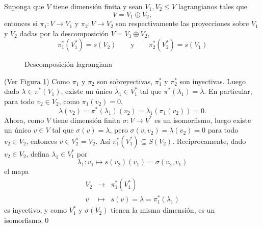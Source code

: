 \begin{pro}
Suponga que $V$ tiene dimensi\'on finita y sean $V_1,V_2\le V$ lagrangianos tales que 
\[
V=V_1\oplus V_2,
\]
entonces si $\pi_1:V\rightarrow V_1$ y $\pi_2:V\rightarrow V_2$ son respectivamente las proyecciones sobre $V_1$ y $V_2$ dadas por la descomposici\'on $V=V_1\oplus V_2$,
\[
\pi_1^*(V_1^*)=s(V_2)\qquad\textrm{y}\qquad\pi_2^*(V_2^*)=s(V_1)
\]
\end{pro}
\begin{figure}[!hbp]
\centering
{}
\caption{Descomposici\'on lagrangiana}
\label{desclag}
\end{figure}

\dem (Ver Figura \ref{desclag}) Como $\pi_1$ y $\pi_2$ son sobreyectivas, $\pi_1^*$ y $\pi_2^*$ son  inyectivas. Luego dado $\lambda\in\pi^*(V_1)$, existe un \'unico $\lambda_1\in V_1^*$ tal que $\pi^*(\lambda_1)=\lambda$. En particular, para todo $v_2\in V_2$, como $\pi_1(v_2)=0$,
\[
\lambda(v_2)=\pi^*(\lambda_1)(v_2)=\lambda_1\left(\pi_1(v_2)\right)=0.
\]
Ahora, como $V$ tiene dimensi\'on finita $\sigma: V\rightarrow V^*$ es un isomorfismo, luego existe un \'unico $v\in V$ tal que $\sigma(v)=\lambda$, pero $\sigma(v,v_2)=\lambda(v_2)=0$ para todo $v_2\in V_2$, entonces $v\in V_2^\sigma=V_2$. As\'i $\pi_1^*(V_1^*)\subseteq S(V_2)$. Reciprocamente, dado $v_2\in V_2$, defina $\lambda_1\in V_1^*$ por
\[
\lambda_1:v_1\mapsto s(v_2)(v_1)=\sigma(v_2,v_1)
\]
el mapa
\begin{eqnarray*}
V_2 & \longrightarrow & \pi_1^*(V_1^*)\\
v & \longmapsto & s(v)=\lambda=\pi_1^*(\lambda_1)
\end{eqnarray*}
es inyectivo, y como $V_1^*$ y $\sigma(V_2)$ tienen la misma dimensi\'on, es un isomorfismo.\qed

